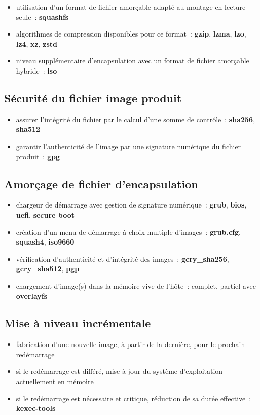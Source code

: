 \documentclass[10pt]{article}
\newenvironment{itmz}{\begin{itemize}
\setlength{\itemsep}{0em}
}{\end{itemize}}
\begin{document}
\begin{itmz}
\item{utilisation d’un format de fichier amorçable adapté au montage en lecture seule : \textbf{squashfs}}
\item{algorithmes de compression disponibles pour ce format : \textbf{gzip}, \textbf{lzma}, \textbf{lzo}, \textbf{lz4}, \textbf{xz}, \textbf{zstd}}
\item{niveau supplémentaire d’encapsulation avec un format de fichier amorçable hybride : \textbf{iso}}
\end{itmz}

\subsection{Sécurité du fichier image produit}

\begin{itmz}
\item{assurer l’intégrité du fichier par le calcul d’une somme de contrôle : \textbf{sha256}, \textbf{sha512}}
\item{garantir l’authenticité de l’image par une signature numérique du fichier produit : \textbf{gpg}}
\end{itmz}

\subsection{Amorçage de fichier d’encapsulation}

\begin{itmz}
\item{chargeur de démarrage avec gestion de signature numérique : \textbf{grub}, \textbf{bios}, \textbf{uefi}, \textbf{secure boot}}
\item{création d’un menu de démarrage à choix multiple d’images : \textbf{grub.cfg}, \textbf{squash4}, \textbf{iso9660}}
\item{vérification d’authenticité et d’intégrité des images : \textbf{gcry\_sha256}, \textbf{gcry\_sha512}, \textbf{pgp}}
\item{chargement d’image(s) dans la mémoire vive de l’hôte : complet, partiel avec \textbf{overlayfs}}
\end{itmz}

\subsection{Mise à niveau incrémentale}

\begin{itmz}
\item{fabrication d’une nouvelle image, à partir de la dernière, pour le prochain redémarrage}
\item{si le redémarrage est différé, mise à jour du système d’exploitation actuellement en mémoire}
\item{si le redémarrage est nécessaire et critique, réduction de sa durée effective : \textbf{kexec-tools}}
\end{itmz}
\end{document}
